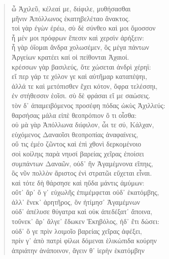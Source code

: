 \begin{Spacing}{1.5}
\begin{verse}
{\large\g  ὦ Ἀχιλεῦ, κέλεαί με, διίφιλε, μυθήσασθαι  } \\
{\large\g  μῆνιν Ἀπόλλωνος ἑκατηβελέταο ἄνακτος.  } \\
{\large\g  τοὶ γὰρ ἐγὼν ἐρέω, σὺ δὲ σύνθεο καὶ μοι ὄμοσσον  } \\
{\large\g  ἦ μέν μοι πρόφρων ἔπεσιν καὶ χερσὶν ἀρήξειν:  } \\
{\large\g  ἦ γὰρ ὀΐομαι ἄνδρα χολωσέμεν, ὃς μέγα πάντων  } \\
{\large\g  Ἀργείων κρατέει καί οἱ πείθονται Ἀχαιοί.  } \\
{\large\g  κρέσσων γὰρ βασιλεύς, ὅτε χώσεται ἀνδρὶ χέρηϊ:  } \\
{\large\g  εἴ περ γάρ τε χόλον γε καὶ αὐτῆμαρ καταπέψηι,  } \\
{\large\g  ἀλλά τε καὶ μετόπισθεν ἔχει κότον, ὄφρα τελέσσηι,  } \\
{\large\g  ἐν στήθεσσιν ἑοῖσι. σὺ δὲ φράσαι εἴ με σαώσεις.  } \\
{\large\g  τὸν δ᾽ ἀπαμειβόμενος προσέφη πόδας ὠκὺς Ἀχιλλεύς:  } \\
{\large\g  θαρσήσας μάλα εἰπὲ θεοπρόπιον ὅ τι οἶσθα:  } \\
{\large\g  οὐ μὰ γὰρ Ἀπόλλωνα διίφιλον, ὧι τε σύ, Κάλχαν,  } \\
{\large\g  εὐχόμενος Δαναοῖσι θεοπροπίας ἀναφαίνεις,  } \\
{\large\g  οὔ τις ἐμέο ζῶντος καὶ ἐπὶ χθονὶ δερκομένοιο  } \\
{\large\g  σοὶ κοίληις παρὰ νηυσί βαρείας χεῖρας ἐποίσει  } \\
{\large\g  συμπάντων Δαναῶν, οὐδ᾽ ἢν Ἀγαμέμνονα εἴπηις,  } \\
{\large\g  ὃς νῦν πολλὸν ἄριστος ἐνὶ στρατῶι εὔχεται εἶναι.  } \\
{\large\g  καὶ τότε δὴ θάρσησε καὶ ηὔδα μάντις ἀμύμων:  } \\
{\large\g  οὔτ᾽ ἄρ᾽ ὅ γ᾽ εὐχωλῆς ἐπιμέμφεται οὐδ᾽ ἑκατόμβης,  } \\
{\large\g  ἀλλ᾽ ἕνεκ᾽ ἀρητῆρος, ὃν ἠτίμησ᾽ Ἀγαμέμνων  } \\
{\large\g  οὐδ᾽ ἀπέλυσε θύγατρα καὶ οὐκ ἀπεδέξατ᾽ ἄποινα,  } \\
{\large\g  τοὔνεκ᾽ ἄρ᾽ ἄλγε᾽ ἔδωκεν Ἑκηβόλος, ἠδ᾽ ἔτι δώσει:  } \\
{\large\g  οὐδ᾽ ὅ γε πρὶν λοιμοῖο βαρείας χεῖρας ἀφέξει,  } \\
{\large\g  πρίν γ᾽ ἀπὸ πατρὶ φίλωι δόμεναι ἑλικώπιδα κούρην  } \\
{\large\g  ἀπριάτην ἀνάποινον, ἄγειν θ᾽ ἱερὴν ἑκατόμβην  } \\

\end{verse}
\end{Spacing}
